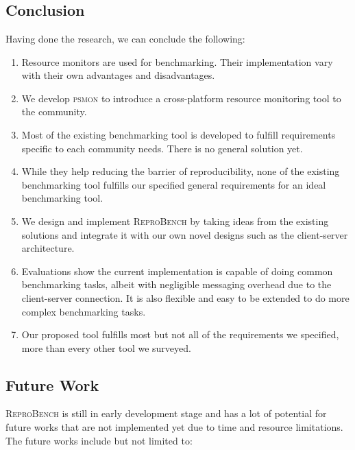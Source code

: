 \chapter{\chConclusion}
\label{ch:conclusion}



\section{Conclusion}

Having done the research, we can conclude the following:

\begin{enumerate}
    \item Resource monitors are used for benchmarking. Their implementation vary with their own advantages and disadvantages.
    \item We develop \textsc{psmon} to introduce a cross-platform resource monitoring tool to the community.
    \item Most of the existing benchmarking tool is developed to fulfill requirements specific to each community needs. There is no general solution yet.
    \item While they help reducing the barrier of reproducibility, none of the existing benchmarking tool fulfills our specified general requirements for an ideal benchmarking tool.
    \item We design and implement \textsc{ReproBench} by taking ideas from the existing solutions and integrate it with our own novel designs such as the client-server architecture.
    \item Evaluations show the current implementation is capable of doing common benchmarking tasks, albeit with negligible messaging overhead due to the client-server connection. It is also flexible and easy to be extended to do more complex benchmarking tasks.
    \item Our proposed tool fulfills most but not all of the requirements we specified, more than every other tool we surveyed.
\end{enumerate}

\section{Future Work}

\textsc{ReproBench} is still in early development stage and has a lot of potential for future works that are not implemented yet due to time and resource limitations.
The future works include but not limited to:

